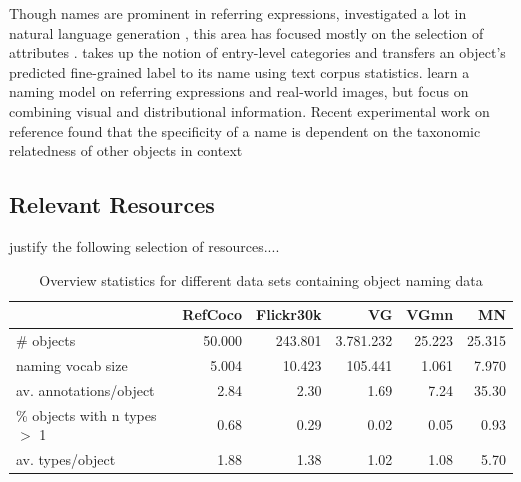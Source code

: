 \documentclass[10pt, a4paper]{article}
\begin{document}
Though names are prominent in referring expressions, investigated a lot in natural language generation \cite{dale:1995}, this area has focused mostly on the selection of attributes %
\cite{krahmer:2012}. 
 takes up the notion of entry-level categories \cite{rosch1976basic} and transfers an object's predicted fine-grained label to its name using text corpus statistics.
  learn a naming model on referring expressions and real-world images, but focus on combining visual and distributional information. 
 Recent experimental work on reference found that the specificity of a name is dependent on the taxonomic relatedness of other objects in context

\subsection{Relevant Resources}

justify the following selection of resources....

\begin{table}
\centering
\begin{tabular}{lrrrrr}
\toprule
                         &   RefCoco &  Flickr30k &           VG &      VGmn &        MN \\
\midrule
                  \# objects & 50.000 & 243.801 & 3.781.232 & 25.223 & 25.315 \\
                naming vocab size &  5.004 &  10.423 &   105.441 &  1.061 &  7.970 \\
     av. annotations/object &      2.84 &       2.30 &         1.69 &      7.24 &     35.30 \\
 \% objects with n types $>$ 1 &      0.68 &       0.29 &         0.02 &      0.05 &      0.93 \\
           av. types/object &      1.88 &       1.38 &         1.02 &      1.08 &      5.70 \\
\bottomrule
\end{tabular}
\caption{Overview statistics for different data sets containing object naming data}
\end{table}
\end{document}
